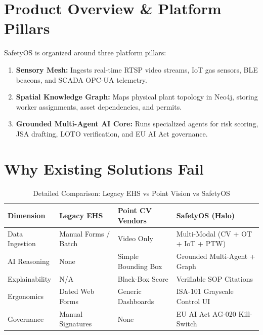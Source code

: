 \documentclass[11pt,a4paper]{article}
\begin{document}

\section{Product Overview \& Platform Pillars}
SafetyOS is organized around three platform pillars:
\begin{enumerate}
    \item \textbf{Sensory Mesh:} Ingests real-time RTSP video streams, IoT gas sensors, BLE beacons, and SCADA OPC-UA telemetry.
    \item \textbf{Spatial Knowledge Graph:} Maps physical plant topology in Neo4j, storing worker assignments, asset dependencies, and permits.
    \item \textbf{Grounded Multi-Agent AI Core:} Runs specialized agents for risk scoring, JSA drafting, LOTO verification, and EU AI Act governance.
\end{enumerate}

\section{Why Existing Solutions Fail}
\begin{table}[htbp]
\centering
\caption{Detailed Comparison: Legacy EHS vs Point Vision vs SafetyOS}
\begin{tabularx}{\textwidth}{
>{\raggedright\arraybackslash}p{}
>{\raggedright\arraybackslash}X
>{\raggedright\arraybackslash}X
>{\raggedright\arraybackslash}X
}
\toprule
\textbf{Dimension} & \textbf{Legacy EHS} & \textbf{Point CV Vendors} & \textbf{SafetyOS (Halo)} \\
\midrule
Data Ingestion & Manual Forms / Batch & Video Only & Multi-Modal (CV + OT + IoT + PTW) \\
AI Reasoning & None & Simple Bounding Box & Grounded Multi-Agent + Graph \\
Explainability & N/A & Black-Box Score & Verifiable SOP Citations \\
Ergonomics & Dated Web Forms & Generic Dashboards & ISA-101 Grayscale Control UI \\
Governance & Manual Signatures & None & EU AI Act AG-020 Kill-Switch \\
\bottomrule
\end{tabularx}
\end{table}
\end{document}
